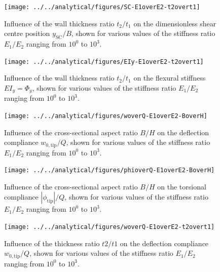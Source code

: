     \begin{figure}[!htpb] %
      \centering
      \texttt{[image: ../../analytical/figures/SC-E1overE2-t2overt1]}
      \caption[Influence of the wall thickness ratio $t_2/t_1$ on the dimensionless shear centre position $y_{\mathrm{SC}}/B$]{Influence of the wall thickness ratio $t_2/t_1$ on the dimensionless shear centre position $y_{\mathrm{SC}}/B$, shown for various values of the stiffness ratio $E_1/E_2$ ranging from $10^0$ to $10^3$. }\label{fig:SC-E1overE2-t2overt1}
    \end{figure}

    \begin{figure}[!htpb] %
      \centering
      \texttt{[image: ../../analytical/figures/EIy-E1overE2-t2overt1]}
      \caption[Influence of the wall thickness ratio $t_2/t_1$ on the flexural stiffness $EI_y$]{Influence of the wall thickness ratio $t_2/t_1$ on the flexural stiffness $EI_y = \Phi_y$, shown for various values of the stiffness ratio $E_1/E_2$ ranging from $10^0$ to $10^3$. }\label{fig:EIy-E1overE2-t2overt1}
    \end{figure}

    \begin{figure}[!htpb] %
      \centering
      \texttt{[image: ../../analytical/figures/woverQ-E1overE2-BoverH]}
      \caption[Influence of the cross-sectional aspect ratio $B/H$ on the deflection compliance]{Influence of the cross-sectional aspect ratio $B/H$ on the deflection compliance $w_{\mathrm{0,tip}} / Q$, shown for various values of the stiffness ratio $E_1/E_2$ ranging from $10^0$ to $10^3$. }\label{fig:woverQ-E1overE2-BoverH}
    \end{figure}

    \begin{figure}[!htpb] %
      \centering
      \texttt{[image: ../../analytical/figures/phioverQ-E1overE2-BoverH]}
      \caption[Influence of the cross-sectional aspect ratio $B/H$ on the torsional compliance]{Influence of the cross-sectional aspect ratio $B/H$ on the torsional compliance $|\phi_{\mathrm{tip}}| / Q$, shown for various values of the stiffness ratio $E_1/E_2$ ranging from $10^0$ to $10^3$. }\label{fig:phioverQ-E1overE2-BoverH}
    \end{figure}

    \begin{figure}[!htpb] %
      \centering
      \texttt{[image: ../../analytical/figures/woverQ-E1overE2-t2overt1]}
      \caption[Influence of the thickness ratio $t2/t1$ on the deflection compliance]{Influence of the thickness ratio $t2/t1$ on the deflection compliance $w_{\mathrm{0,tip}} / Q$, shown for various values of the stiffness ratio $E_1/E_2$ ranging from $10^0$ to $10^3$. }\label{fig:woverQ-E1overE2-t2overt1}
    \end{figure}

